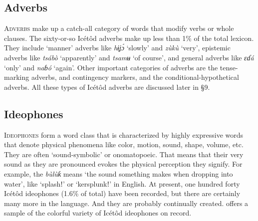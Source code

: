 \subsection{Adverbs}\label{sec:3.9}


\textsc{Adverbs} make up a catch-all category of words that modify verbs or whole clauses. The sixty-or-so Icétôd adverbs make up less than 1\% of the total lexicon. They include ‘manner’ adverbs like \textit{hɨ{\Í}ʝ\'{ɔ}} ‘slowly’ and \textit{zùkù} ‘very’, epistemic adverbs like \textit{tsábò} ‘apparently’ and \textit{tsamʉ} ‘of course’, and general adverbs like \textit{ɛɗá} ‘only’ and \textit{naɓó} ‘again’. Other important categories of adverbs are the tense-marking adverbs,  and contingency markers, and the conditional-hypothetical adverbs. All these types of Icétôd adverbs are discussed later in §9.




\subsection{Ideophones}\label{sec:3.10}


\textsc{Ideophones} form a word class that is characterized by highly expressive words that denote physical phenomena like color, motion, sound, shape, volume, etc. They are often ‘sound-symbolic’ or onomatopoeic. That means that their very sound as they are pronounced evokes the physical perception they signify. For example, the  \textit{bùlùƙ\ᵘ} means ‘the sound something makes when dropping into water’, like ‘splashǃ’ or ‘kersplunkǃ’ in English. At present, one hundred forty Icétôd ideophones (1.6\% of total) have been recorded, but there are certainly many more in the language. And they are probably continually created.  offers a sample of the colorful variety of Icétôd ideophones on record.


